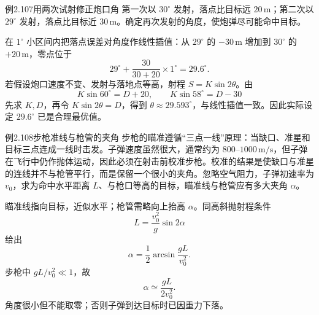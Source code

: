 \begin{origexamplebox}{例2.107\quad 用两次试射修正炮口角}
第一次以 $30^\circ$ 发射，落点比目标远 $20\,\mathrm m$；第二次以 $29^\circ$ 发射，落点比目标近 $30\,\mathrm m$。确定再次发射的角度，使炮弹尽可能命中目标。
\end{origexamplebox}
\begin{xesolution}
在 $1^\circ$ 小区间内把落点误差对角度作线性插值：从 $29^\circ$ 的 $-30\,\mathrm m$ 增加到 $30^\circ$ 的 $+20\,\mathrm m$，零点位于
\[
29^\circ+\frac{30}{30+20}\times1^\circ
=\boxed{29.6^\circ}.
\]
若假设炮口速度不变、发射与落地点等高，射程 $S=K\sin2\theta$。由
\[
K\sin60^\circ=D+20,
\qquad K\sin58^\circ=D-30
\]
先求 $K,D$，再令 $K\sin2\theta=D$，得到 $\theta\approx29.593^\circ$，与线性插值一致。因此实际设定 $29.6^\circ$ 已是合理最优值。
\end{xesolution}

\begin{origexamplebox}{例2.108\quad 步枪准线与枪管的夹角}
步枪的瞄准遵循“三点一线”原理：当缺口、准星和目标三点连成一线时击发。子弹速度虽然很大，通常约为 $800$--$1000\,\mathrm{m/s}$，但子弹在飞行中仍作抛体运动，因此必须在射击前校准步枪。校准的结果是使缺口与准星的连线并不与枪管平行，而是保留一个很小的夹角。忽略空气阻力，子弹初速率为 $v_0$，求为命中水平距离 $L$、与枪口等高的目标，瞄准线与枪管应有多大夹角 $\alpha$。
\end{origexamplebox}
\begin{xesolution}
瞄准线指向目标，近似水平；枪管需略向上抬高 $\alpha$。同高斜抛射程条件
\[
L=\frac{v_0^2}{g}\sin2\alpha
\]
给出
\[
\boxed{\alpha=\frac12\arcsin\frac{gL}{v_0^2}}.
\]
步枪中 $gL/v_0^2\ll1$，故
\[
\boxed{\alpha\simeq\frac{gL}{2v_0^2}}.
\]
角度很小但不能取零；否则子弹到达目标时已因重力下落。
\end{xesolution}

